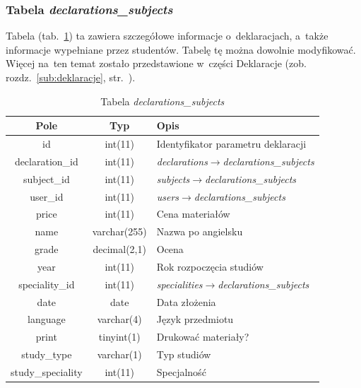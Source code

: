 \documentclass[a4paper,12pt,oneside]{report}
\begin{document}
\subsubsection{Tabela \emph{declarations\_subjects}}
\label{subsub:declarations_subjects}
Tabela (tab.~\ref{tab:declarations_subjects}) ta zawiera szczegółowe informacje o~deklaracjach, a~także informacje wypełniane przez studentów. Tabelę tę można dowolnie modyfikować. Więcej na~ten temat zostało przedstawione w~części Deklaracje (zob. rozdz.~\ref{sub:deklaracje}, str.~\pageref{sub:deklaracje}).

\begin{table}[h]
  \centering
  \begin{tabular}{|c|c|l|}\hline
  Pole & Typ & Opis \\\hline
  id   & int(11)   & Identyfikator parametru deklaracji\\
  declaration\_id   & int(11)      & \emph{declarations}$\to$\emph{declarations\_subjects}\\
  subject\_id       & int(11)      & \emph{subjects}$\to$\emph{declarations\_subjects}\\
  user\_id          & int(11)      & \emph{users}$\to$\emph{declarations\_subjects}\\
  price             & int(11)      & Cena materiałów \\
  name              & varchar(255) & Nazwa po angielsku \\
  grade             & decimal(2,1) & Ocena \\
  year              & int(11)      & Rok rozpoczęcia studiów \\
  speciality\_id    & int(11)      & \emph{specialities}$\to$\emph{declarations\_subjects} \\
  date              & date         & Data złożenia \\
  language          & varchar(4)   & Język przedmiotu \\
  print             & tinyint(1)   & Drukować materiały? \\
  study\_type       & varchar(1)   & Typ studiów \\
  study\_speciality & int(11)      & Specjalność \\\hline
  \end{tabular}
  \caption{Tabela \emph{declarations\_subjects}\label{tab:declarations_subjects}}
\end{table}
\end{document}

